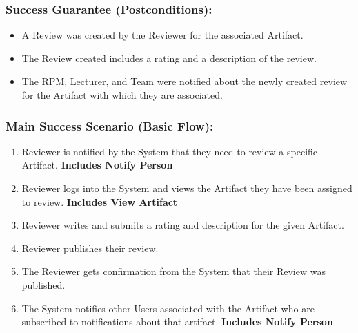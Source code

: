     
    
    
    \subsubsection*{Success Guarantee (Postconditions):}
    \begin{itemize}
    \itemsep-1em 
       \item A Review was created by the Reviewer for the associated Artifact.
       \item The Review created includes a rating and a description of the review.
\item The RPM, Lecturer, and Team were notified about the newly created review for
        the Artifact with which they are associated.
    \end{itemize}
    
    
    
    \subsubsection*{Main Success Scenario (Basic Flow):}
    \begin{enumerate}
        \itemsep-1em 
        \item Reviewer is notified by the System that they need to review a specific Artifact. \textbf{Includes Notify Person}
        \item Reviewer logs into the System and views the Artifact they have been assigned
         to review. \textbf{Includes View Artifact}
        \item Reviewer writes and submits a rating and description for the given Artifact.
         \item Reviewer publishes their review.
         \item The Reviewer gets confirmation from the System that their Review was
          published.
          \item The System notifies other Users associated with the Artifact who are subscribed to notifications about that artifact. \textbf{Includes Notify Person}
    \end{enumerate}
    
    
    
    
